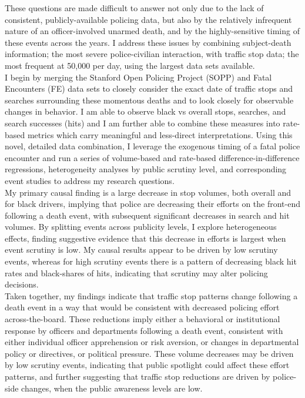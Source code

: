 These questions are made difficult to answer not only due to the lack of consistent, publicly-available policing data, but also by the relatively infrequent nature of an officer-involved unarmed death, and by the highly-sensitive timing of these events across the years. I address these issues by combining subject-death information; the most severe police-civilian interaction, with traffic stop data; the most frequent at 50,000 per day, using the largest data sets available. \\

I begin by merging the Stanford Open Policing Project (SOPP) and Fatal Encounters (FE) data sets to closely consider the exact date of traffic stops and searches surrounding these momentous deaths and to look closely for observable changes in behavior. I am able to observe black vs overall stops, searches, and search successes (hits) and I am further able to combine these measures into rate-based metrics which carry meaningful and less-direct interpretations. Using this novel, detailed data combination, I leverage the exogenous timing of a fatal police encounter and run a series of volume-based and rate-based difference-in-difference regressions, heterogeneity analyses by public scrutiny level, and corresponding event studies to address my research questions. \\

My primary causal finding is a large decrease in stop volumes, both overall and for black drivers, implying that police are decreasing their efforts on the front-end following a death event, with subsequent significant decreases in search and hit volumes. By splitting events across publicity levels, I explore heterogeneous effects, finding suggestive evidence that this decrease in efforts is largest when event scrutiny is low. My causal results appear to be driven by low scrutiny events, whereas for high scrutiny events there is a pattern of decreasing black hit rates and black-shares of hits, indicating that scrutiny may alter policing decisions. \\

Taken together, my findings indicate that traffic stop patterns change following a death event in a way that would be consistent with decreased policing effort across-the-board. These reductions imply either a behavioral or institutional response by officers and departments following a death event, consistent with either individual officer apprehension or risk aversion, or changes in departmental policy or directives, or political pressure. These volume decreases may be driven by low scrutiny events, indicating that public spotlight could affect these effort patterns, and further suggesting that traffic stop reductions are driven by police-side changes, when the public awareness levels are low. \\

